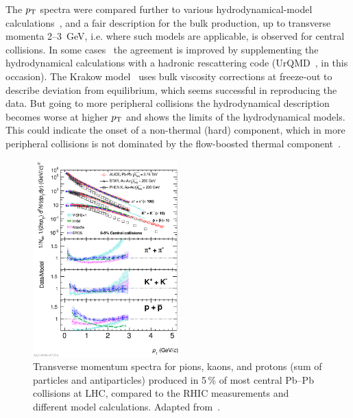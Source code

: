 The $p_{\rm T}$ spectra were compared further to various hydrodynamical-model calculations~\cite{Shen:2011eg,Bozek:2012qs,Werner:2012xh,Karpenko:2012yf}, and a fair description for the bulk production, up to transverse momenta 2--3~GeV, i.e. where such models are applicable, is observed for central collisions. In some cases~\cite{Karpenko:2012yf,Karpenko:2011qn} the agreement is improved by supplementing the hydrodynamical calculations with a hadronic rescattering code (UrQMD~\cite{Bass:1998ca}, in this occasion). The Krakow model~\cite{Bozek:2011ua,Bozek:2011gq} uses bulk viscosity corrections at freeze-out to describe deviation from equilibrium, which seems successful in reproducing the data. But going to more peripheral collisions the hydrodynamical description becomes worse at higher $p_{\rm T}$ and shows the limits of the hydrodynamical models. This could indicate the onset of a non-thermal (hard) component, which in more peripheral collisions is not dominated by the flow-boosted thermal component~\cite{Bozek:2012qs}.

\begin{figure}
\centering
\includegraphics[width=0.5\textwidth]{ksfigures/IdentPartSpec.pdf}
\caption{Transverse momentum spectra for pions, kaons, and protons (sum of particles and antiparticles) produced in 5\,\% of most central Pb--Pb collisions at LHC, compared to the RHIC measurements and different model calculations. Adapted from~\cite{Abelev:2012wca}.}
\label{figks:IdentPartSpec}
\end{figure}

